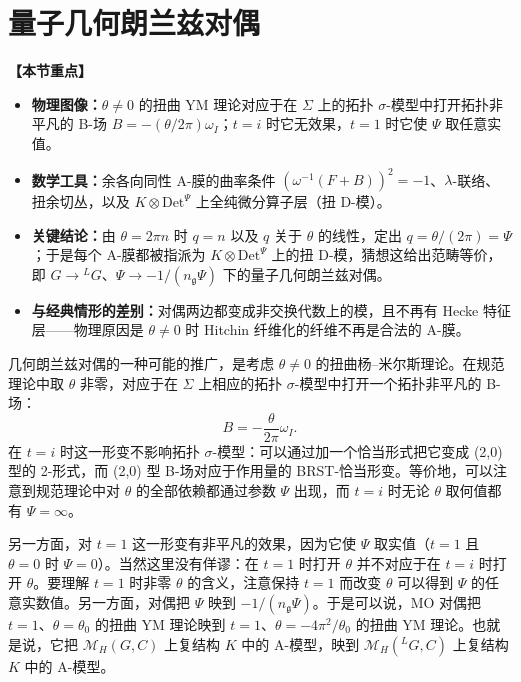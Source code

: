 \documentclass[11pt,a4paper,UTF8]{ctexart}
\newenvironment{keypoints}{%
  \par\addvspace{0.9em}%
  \noindent{\color{black!80}\rule{\linewidth}{0.6pt}}\par\nopagebreak\vspace{2pt}%
  \noindent\textbf{【本节重点】}\par\nopagebreak\vspace{2pt}%
  \begin{itemize}[leftmargin=1.6em,itemsep=1pt,topsep=2pt,parsep=0pt]%
}{%
  \end{itemize}\vspace{1pt}\noindent{\color{black!80}\rule{\linewidth}{0.6pt}}\par\addvspace{0.9em}%
}
\begin{document}
\section{量子几何朗兰兹对偶}

\begin{keypoints}
    \item \textbf{物理图像：}$\theta\neq 0$ 的扭曲 YM 理论对应于在 $\Sigma$ 上的拓扑 $\sigma$-模型中打开拓扑非平凡的 B-场 $B=-(\theta/2\pi)\omega_{I}$；$t=i$ 时它无效果，$t=1$ 时它使 $\Psi$ 取任意实值。
    \item \textbf{数学工具：}余各向同性 A-膜的曲率条件 $(\omega^{-1}(F+B))^{2}=-1$、$\lambda$-联络、扭余切丛，以及 $K\otimes\mathrm{Det}^{\Psi}$ 上全纯微分算子层（扭 D-模）。
    \item \textbf{关键结论：}由 $\theta=2\pi n$ 时 $q=n$ 以及 $q$ 关于 $\theta$ 的线性，定出 $q=\theta/(2\pi)=\Psi$；于是每个 A-膜都被指派为 $K\otimes\mathrm{Det}^{\Psi}$ 上的扭 D-模，猜想这给出范畴等价，即 $G\to{}^{L}G$、$\Psi\to-1/(n_{\mathfrak{g}}\Psi)$ 下的量子几何朗兰兹对偶。
    \item \textbf{与经典情形的差别：}对偶两边都变成非交换代数上的模，且不再有 Hecke 特征层——物理原因是 $\theta\neq 0$ 时 Hitchin 纤维化的纤维不再是合法的 A-膜。
\end{keypoints}


几何朗兰兹对偶的一种可能的推广，是考虑 $\theta\neq 0$ 的扭曲杨–米尔斯理论。在规范理论中取 $\theta$ 非零，对应于在 $\Sigma$ 上相应的拓扑 $\sigma$-模型中打开一个拓扑非平凡的 B-场：
\[
    B=-\frac{\theta}{2\pi}\omega_{I}.
\]
在 $t=i$ 时这一形变不影响拓扑 $\sigma$-模型：可以通过加一个恰当形式把它变成 (2,0) 型的 2-形式，而 (2,0) 型 B-场对应于作用量的 BRST-恰当形变。等价地，可以注意到规范理论中对 $\theta$ 的全部依赖都通过参数 $\Psi$ 出现，而 $t=i$ 时无论 $\theta$ 取何值都有 $\Psi=\infty$。


另一方面，对 $t=1$ 这一形变有非平凡的效果，因为它使 $\Psi$ 取实值（$t=1$ 且 $\theta=0$ 时 $\Psi=0$）。当然这里没有佯谬：在 $t=1$ 时打开 $\theta$ 并不对应于在 $t=i$ 时打开 $\theta$。要理解 $t=1$ 时非零 $\theta$ 的含义，注意保持 $t=1$ 而改变 $\theta$ 可以得到 $\Psi$ 的任意实数值。另一方面，对偶把 $\Psi$ 映到 $-1/(n_{\mathfrak{g}}\Psi)$。于是可以说，MO 对偶把 $t=1$、$\theta=\theta_{0}$ 的扭曲 YM 理论映到 $t=1$、$\theta=-4\pi^{2}/\theta_{0}$ 的扭曲 YM 理论。也就是说，它把 $\mathcal{M}_{H}(G,C)$ 上复结构 $K$ 中的 A-模型，映到 $\mathcal{M}_{H}({}^{L}G,C)$ 上复结构 $K$ 中的 A-模型。
\end{document}
